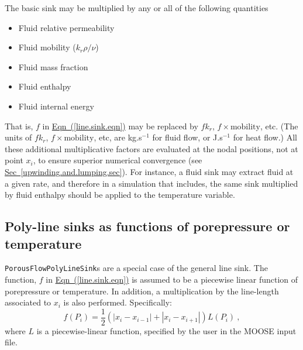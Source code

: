 \documentclass[12pt]{report}
\begin{document}
The basic sink may be multiplied by any or all of the following
quantities
\begin{itemize}
\item Fluid relative permeability
\item Fluid mobility ($k_{r} \rho / \nu$)
\item Fluid mass fraction
\item Fluid enthalpy
\item Fluid internal energy
\end{itemize}
That is, $f$ in \hyperref[line.sink.eqn]{Eqn~(\ref*{line.sink.eqn})}
may be replaced by $fk_{r}$, $f\times\mbox{mobility}$, etc.  (The
units of $fk_{r}$, $f\times\mbox{mobility}$, etc, are kg.s$^{-1}$ for
fluid flow, or J.s$^{-1}$ for heat flow.)  All these additional
multiplicative factors are evaluated at the nodal positions, not at
point $x_{i}$, to ensure superior numerical convergence (see
\hyperref[upwinding.and.lumping.sec]{Sec~\ref*{upwinding.and.lumping.sec}}).
For instance, a fluid sink may extract fluid at a given rate, and
therefore in a simulation that includes, the same sink multiplied by
fluid enthalpy should be applied to the temperature variable.

\subsection{Poly-line sinks as functions of porepressure or temperature}

{\tt PorousFlowPolyLineSink}s are a special case of the general line
sink.  The function, $f$ in
\hyperref[line.sink.eqn]{Eqn~(\ref*{line.sink.eqn})} is assumed to be
a piecewise linear function of porepressure or temperature.  In
addition, a multiplication by the line-length associated to $x_{i}$ is
also performed.  Specifically:
\begin{equation}
f(P_{i}) = \mbox{$\frac{1}{2}$}\left( |x_{i} - x_{i-1}| + |x_{i} - x_{i+1}|
\right) L(P_{i}) \ ,
\label{pls.eqn}
\end{equation}
where $L$ is a piecewise-linear function, specified by the user in the
MOOSE input file.
\end{document}
